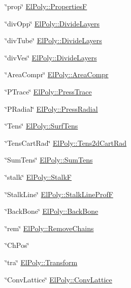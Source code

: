 \begin{DoxyItemize}
\item \char`\"{}prop\char`\"{} \hyperlink{classElPoly_ae41ade7fbfd977babf42a7e2e6b33f07}{\-El\-Poly\-::\-Properties\-F} 
\item \char`\"{}div\-Opp\char`\"{} \hyperlink{classElPoly_acffadf1cdc641927dfd8af49eebc2069}{\-El\-Poly\-::\-Divide\-Layers} 
\item \char`\"{}div\-Tube\char`\"{} \hyperlink{classElPoly_acffadf1cdc641927dfd8af49eebc2069}{\-El\-Poly\-::\-Divide\-Layers} 
\item \char`\"{}div\-Ves\char`\"{} \hyperlink{classElPoly_acffadf1cdc641927dfd8af49eebc2069}{\-El\-Poly\-::\-Divide\-Layers} 
\item \char`\"{}\-Area\-Compr\char`\"{} \hyperlink{classElPoly_afbe805e551084aebeee2c673c9b3937a}{\-El\-Poly\-::\-Area\-Compr} 
\item \char`\"{}\-P\-Trace\char`\"{} \hyperlink{classElPoly_a534f27d79203f0b018acaedf41bbdb13}{\-El\-Poly\-::\-Press\-Trace} 
\item \char`\"{}\-P\-Radial\char`\"{} \hyperlink{classElPoly_a17a99c936b16e1880291e6c3c5957e44}{\-El\-Poly\-::\-Press\-Radial} 
\item \char`\"{}\-Tens\char`\"{} \hyperlink{classElPoly_af9a44196e456df096e96d914e19d85c9}{\-El\-Poly\-::\-Surf\-Tens} 
\item \char`\"{}\-Tens\-Cart\-Rad\char`\"{} \hyperlink{classElPoly_a7282d2e3fe0a3ee0caa631363913cc0a}{\-El\-Poly\-::\-Tens2d\-Cart\-Rad} 
\item \char`\"{}\-Sum\-Tens\char`\"{} \hyperlink{classElPoly_a35c812e3cfa8e0031dc2b521e075c1c9}{\-El\-Poly\-::\-Sum\-Tens} 
\item \char`\"{}stalk\char`\"{} \hyperlink{classElPoly_aba321cce3649252deca41a462b0e3d38}{\-El\-Poly\-::\-Stalk\-F} 
\item \char`\"{}\-Stalk\-Line\char`\"{} \hyperlink{classElPoly_adbfe7fc41363f770eee9c2a9e0e1ed57}{\-El\-Poly\-::\-Stalk\-Line\-Prof\-F} 
\item \char`\"{}\-Back\-Bone\char`\"{} \hyperlink{classVarData_abe9b658d50575d5d6be580bc87f3b4ac}{\-El\-Poly\-::\-Back\-Bone} 
\item \char`\"{}rem\char`\"{} \hyperlink{classElPoly_abfd537703af91a0dceb86c6bba5bd213}{\-El\-Poly\-::\-Remove\-Chains} 
\item \char`\"{}\-Ch\-Pos\char`\"{} 
\item \char`\"{}tra\char`\"{} \hyperlink{classVarData_aa63b2c1f38f3684a08db6394f92707f1}{\-El\-Poly\-::\-Transform} 
\item \char`\"{}\-Conv\-Lattice\char`\"{} \hyperlink{classElPoly_a3e03070150b93328661ff2c857eebbf4}{\-El\-Poly\-::\-Conv\-Lattice} 

\end{DoxyItemize}
